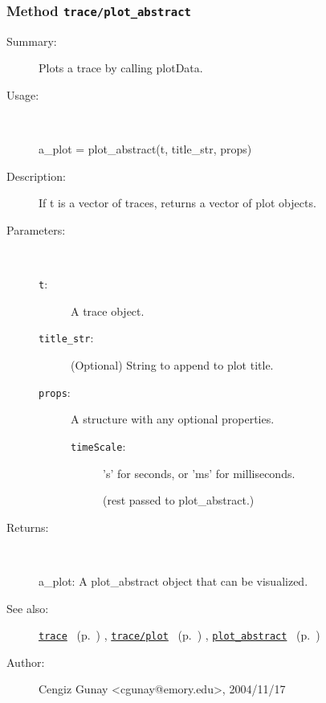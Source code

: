 \subsubsection[Method \texttt{plot\_abstract}]{Method \texttt{trace/plot\_abstract}}%
%
\label{ref_trace__plot_abstract}%
\hypertarget{ref_trace__plot_abstract}{}%
\begin{description}
\item[Summary:]Plots a trace by calling plotData.
%
\item[Usage:]~%
\begin{lyxcode}%
a\_plot = plot\_abstract(t, title\_str, props)
%
\end{lyxcode}%
%
\item[Description:]%
If t is a vector of traces, returns a vector of plot objects.
\item[Parameters:]~
\begin{description}%
\item[\texttt{t}:]
 A trace object.
\item[\texttt{title\_str}:]
 (Optional) String to append to plot title.
\item[\texttt{props}:]
 A structure with any optional properties.
\begin{description}%
\item[\texttt{timeScale}:]
 's' for seconds, or 'ms' for milliseconds.

(rest passed to plot\_abstract.)
\end{description}%
\end{description}%
%
\item[Returns:
]~

	a\_plot: A plot\_abstract object that can be visualized.
%
%
\item[See also:]%
\hyperlink{ref_trace}{\texttt{trace}}%
\ (p.~\pageref{ref_trace})%
%
, \hyperlink{ref_trace__plot}{\texttt{trace/plot}}%
\ (p.~\pageref{ref_trace__plot})%
%
, \hyperlink{ref_plot_abstract}{\texttt{plot\_abstract}}%
\ (p.~\pageref{ref_plot_abstract})%
%
%
\item[Author:]%
Cengiz Gunay <cgunay@emory.edu>, 2004/11/17
%
\end{description}
\methodline%
